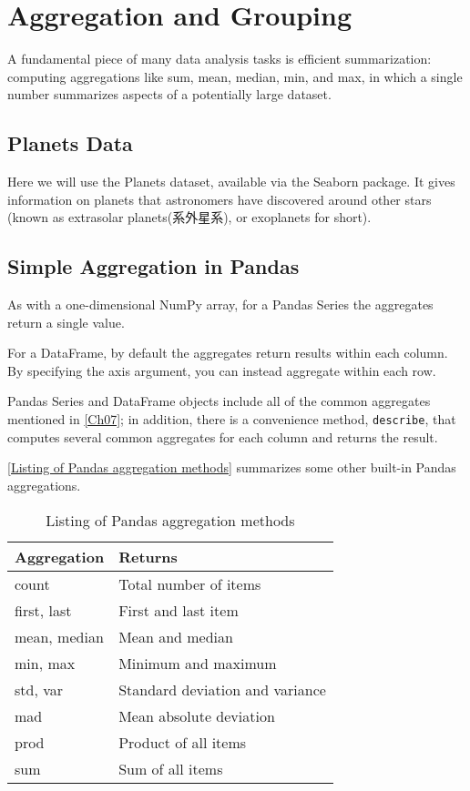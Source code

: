 \chapter{Aggregation and Grouping\label{Ch20}}
A fundamental piece of many data analysis tasks is efficient summarization: computing aggregations like sum, mean, median, min, and max, in which a single number summarizes aspects of a potentially large dataset.
\section{Planets Data}
Here we will use the Planets dataset, available via the Seaborn package. It gives information on planets that astronomers have discovered around
other stars (known as extrasolar planets(系外星系), or exoplanets for short).
\section{Simple Aggregation in Pandas}
As with a one-dimensional NumPy array, for a Pandas Series the aggregates return a
single value.

For a DataFrame, by default the aggregates return results within each column. By specifying the axis argument, you can instead aggregate within each row.

Pandas Series and DataFrame objects include all of the common aggregates mentioned in \autoref{Ch07}; in addition, there is a convenience method, \verb|describe|, that computes several common aggregates for each column and returns the result.

\autoref{Listing of Pandas aggregation methods} summarizes some other built-in Pandas aggregations.

\begin{table}
    \centering
    \caption{Listing of Pandas aggregation methods}
    \label{Listing of Pandas aggregation methods}
    \begin{tabular}{ll}
        \hline
        Aggregation  & Returns                         \\
        \hline
        count        & Total number of items           \\
        first, last  & First and last item             \\
        mean, median & Mean and median                 \\
        min, max     & Minimum and maximum             \\
        std, var     & Standard deviation and variance \\
        mad          & Mean absolute deviation         \\
        prod         & Product of all items            \\
        sum          & Sum of all items                \\
        \hline
    \end{tabular}
\end{table}
